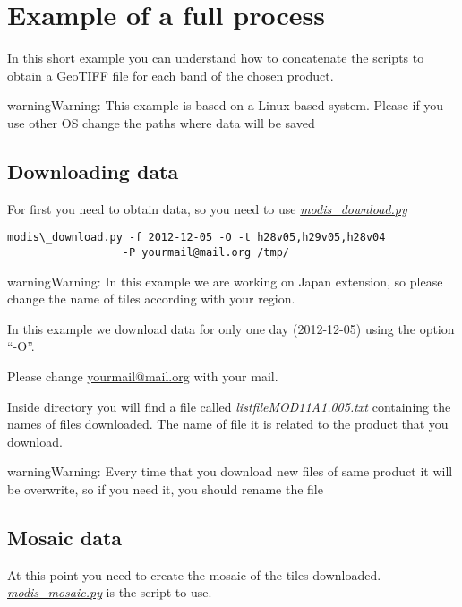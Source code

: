 \documentclass[a4paper,11pt,oneside]{sphinxmanual}
\begin{document}
\chapter{Example of a full process}
\label{examples/full_example::doc}\label{examples/full_example:example-of-a-full-process}
In this short example you can understand how to concatenate
the scripts to obtain a GeoTIFF file for each band of the
chosen product.

\begin{notice}{warning}{Warning:}
This example is based on a Linux based system. Please if
you use other OS change the paths where data will be saved
\end{notice}


\section{Downloading data}
\label{examples/full_example:downloading-data}
For first you need to obtain data, so you need to use {\hyperref[scripts/modis_download::doc]{\emph{modis\_download.py}}}

\begin{Verbatim}[commandchars=\\\{\}]
modis\_download.py -f 2012-12-05 -O -t h28v05,h29v05,h28v04
                  -P yourmail@mail.org /tmp/
\end{Verbatim}

\begin{notice}{warning}{Warning:}
In this example we are working on Japan extension, so please
change the name of tiles according with your region.

In this example we download data for only one day (2012-12-05)
using the option ``-O''.

Please change \href{mailto:yourmail@mail.org}{yourmail@mail.org} with your mail.
\end{notice}

Inside  directory you will find a file called \emph{listfileMOD11A1.005.txt}
containing the names of files downloaded. The name of file it is related to
the product that you download.

\begin{notice}{warning}{Warning:}
Every time that you download new files of same product it will be overwrite,
so if you need it, you should rename the file
\end{notice}


\section{Mosaic data}
\label{examples/full_example:mosaic-data}
At this point you need to create the mosaic of the tiles downloaded.
{\hyperref[scripts/modis_mosaic::doc]{\emph{modis\_mosaic.py}}} is the script to use.
\end{document}

